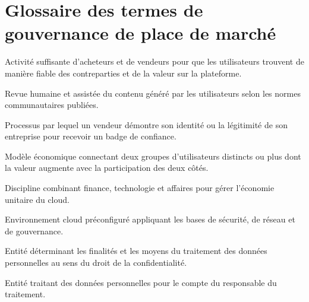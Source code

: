 \chapter{Glossaire des termes de gouvernance de place de marché}
\label{app:glossary-extended}

\begin{description}[style=nextline,leftmargin=3cm]
  \item[Liquidité] Activité suffisante d'acheteurs et de vendeurs pour que les utilisateurs trouvent de manière fiable des contreparties et de la valeur sur la plateforme.
  \item[Modération] Revue humaine et assistée du contenu généré par les utilisateurs selon les normes communautaires publiées.
  \item[Vérification] Processus par lequel un vendeur démontre son identité ou la légitimité de son entreprise pour recevoir un badge de confiance.
  \item[Plateforme multi-acteurs] Modèle économique connectant deux groupes d'utilisateurs distincts ou plus dont la valeur augmente avec la participation des deux côtés.
  \item[FinOps] Discipline combinant finance, technologie et affaires pour gérer l'économie unitaire du cloud.
  \item[Zone d'atterrissage] Environnement cloud préconfiguré appliquant les bases de sécurité, de réseau et de gouvernance.
  \item[Responsable du traitement] Entité déterminant les finalités et les moyens du traitement des données personnelles au sens du droit de la confidentialité.
  \item[Sous-traitant] Entité traitant des données personnelles pour le compte du responsable du traitement.
\end{description}
